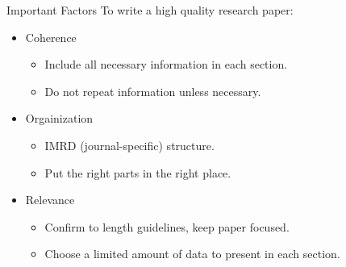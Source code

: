 \documentclass[14pt,t]{beamer}
\begin{document}
\begin{frame}{Important Factors}
To write a high quality research paper:
\begin{itemize}
    \item Coherence
    \begin{itemize}
        \item Include all necessary information in each section.
        \item Do not repeat information unless necessary.
    \end{itemize}
    \item Orgainization
    \begin{itemize}
        \item IMRD (journal-specific) structure.
        \item Put the right parts in the right place.
    \end{itemize}
    \item Relevance
    \begin{itemize}
        \item Confirm to length guidelines, keep paper focused.
        \item Choose a limited amount of data to present in each section.
    \end{itemize}
\end{itemize}

\end{frame}
\end{document}
